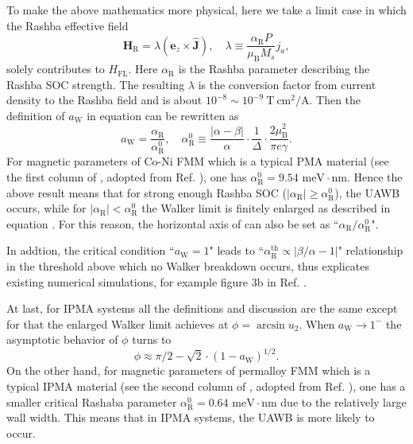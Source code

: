 \documentclass[12pt]{iopart}
\begin{document}
To make the above mathematics more physical, here we take a limit case in which
the Rashba effective field\cite{Zhang_PRB_2008,Zhang_PRB_2009}
\begin{equation}\label{Effective_Rashba_field}
\mathbf{H}_{\mathrm{R}}=\lambda\left(\mathbf{e}_z \times \hat{\mathbf{J}}\right),\quad \lambda\equiv \frac{\alpha_{\mathrm{R}}P}{\mu_{\mathrm{B}} M_s}j_a,
\end{equation}
solely contributes to $H_{\mathrm{FL}}$.
Here $\alpha_{\mathrm{R}}$ is the Rashba parameter describing the Rashba SOC strength.
The resulting $\lambda$ is the conversion factor from current density to the Rashba field and
is about $10^{-8}\sim 10^{-9}\ \mathrm{T\ cm^2/A}$\cite{Miron_Nmat_2010,Seo_APL_2010}.
Then the definition of $a_{\mathrm{W}}$ in equation  can 
be rewritten as
\begin{equation}\label{a_W_redefinition}
a_{\mathrm{W}}=\frac{\alpha_{\mathrm{R}}}{\alpha_{\mathrm{R}}^0},\quad \alpha_{\mathrm{R}}^0\equiv\frac{|\alpha-\beta|}{\alpha}\cdot\frac{1}{\Delta}\cdot \frac{2\mu_{\mathrm{B}}^2}{\pi e \gamma}.
\end{equation}
For magnetic parameters of Co-Ni FMM which is a typical 
PMA material (see the first column of , adopted from Ref. \cite{Risinggad_PRB_2017}),
one has $\alpha_{\mathrm{R}}^0=9.54$ $\mathrm{meV\cdot nm}$. 
Hence the above result means that for strong enough Rashba SOC ($|\alpha_{\mathrm{R}}|\ge \alpha_{\mathrm{R}}^0$),
the UAWB occurs, while for $|\alpha_{\mathrm{R}}|<\alpha_{\mathrm{R}}^0$
the Walker limit is finitely enlarged as described in equation .
For this reason, the horizontal axis of  can also be set as ``$\alpha_{\mathrm{R}}/\alpha_{\mathrm{R}}^0$".

In addtion, the critical condition ``$a_{\mathrm{W}}=1$" leads to 
``$\alpha_{\mathrm{R}}^{\mathrm{th}}\propto |\beta/\alpha-1|$" relationship
in the threshold above which no Walker breakdown occurs, thus explicates existing numerical
simulations, for example figure 3b in Ref. \cite{Seo_JMMM_2012}.

At last, for IPMA systems all the definitions and discussion are the same except for that 
the enlarged Walker limit achieves at $\phi=\arcsin u_2$.
When $a_{\mathrm{W}}\rightarrow 1^-$ the asymptotic behavior of $\phi$ turns to
\begin{equation}\label{phi_aW_1_only_FL_SOTs_IPMA}
\phi\approx\pi/2-\sqrt{2}\cdot\left(1-a_{\mathrm{W}}\right)^{1/2}.
\end{equation}
On the other hand, for magnetic parameters of permalloy FMM which is a typical 
IPMA material (see the second column of , adopted from Ref. \cite{Seo_APL_2012}),
one has a smaller critical Rashaba parameter $\alpha_{\mathrm{R}}^0=0.64$ $\mathrm{meV\cdot nm}$ 
due to the relatively large wall width. This means that in IPMA systems,
the UAWB is more likely to occur. 
\end{document}
